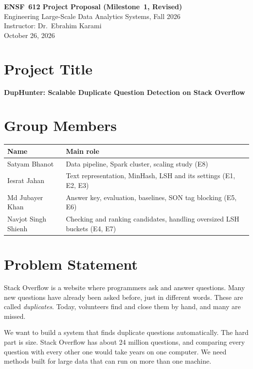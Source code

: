 \documentclass[11pt,a4paper]{article}
\begin{document}
\begin{center}
  {\Large\bfseries ENSF~612 Project Proposal (Milestone~1, Revised)}\\[3pt]
  {\small Engineering Large-Scale Data Analytics Systems, Fall 2026\\[1pt]
  Instructor: Dr.~Ebrahim Karami\\[1pt]
  October 26, 2026}
\end{center}


\section{Project Title}
\textbf{DupHunter: Scalable Duplicate Question Detection on Stack Overflow}

\section{Group Members}
{\small
\begin{tabularx}{\textwidth}{@{}l Y@{}}
\toprule
\textbf{Name} & \textbf{Main role} \\
\midrule
Satyam Bhanot       & Data pipeline, Spark cluster, scaling study (E8) \\
Iesrat Jahan        & Text representation, MinHash, LSH and its settings (E1, E2, E3) \\
Md Jubayer Khan     & Answer key, evaluation, baselines, SON tag blocking (E5, E6) \\
Navjot Singh Shienh & Checking and ranking candidates, handling oversized LSH buckets (E4, E7) \\
\bottomrule
\end{tabularx}}

\section{Problem Statement}

Stack Overflow is a website where programmers ask and answer questions. Many
new questions have already been asked before, just in different words. These
are called \emph{duplicates}. Today, volunteers find and close them by hand,
and many are missed.

We want to build a system that finds duplicate questions automatically. The
hard part is size. Stack Overflow has about 24 million questions, and comparing
every question with every other one would take years on one computer. We need
methods built for large data that can run on more than one machine.
\end{document}
